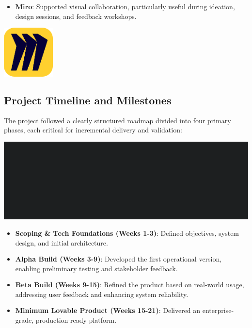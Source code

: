 \begin{itemize}
    \item \textbf{Miro}: Supported visual collaboration, particularly useful during ideation, design sessions, and feedback workshops.
\end{itemize}

\begin{center}
    \centering
    \includegraphics[width=0.2\textwidth]{Images/Miro Logo.png}
     \cite{miro_logo}
    \label{fig:miro_logo}
\end{center}

\subsection{Project Timeline and Milestones}
The project followed a clearly structured roadmap divided into four primary phases, each critical for incremental delivery and validation:

\begin{center}
    \centering
    \includegraphics[width=1\textwidth]{Images/Gantt Diagram.png}
    \label{fig:gantt_diagram}
\end{center}

\begin{itemize}
    \item \textbf{Scoping \& Tech Foundations (Weeks 1-3)}: Defined objectives, system design, and initial architecture.
    \item \textbf{Alpha Build (Weeks 3-9)}: Developed the first operational version, enabling preliminary testing and stakeholder feedback.
    \item \textbf{Beta Build (Weeks 9-15)}: Refined the product based on real-world usage, addressing user feedback and enhancing system reliability.
    \item \textbf{Minimum Lovable Product (Weeks 15-21)}: Delivered an enterprise-grade, production-ready platform.
\end{itemize}

